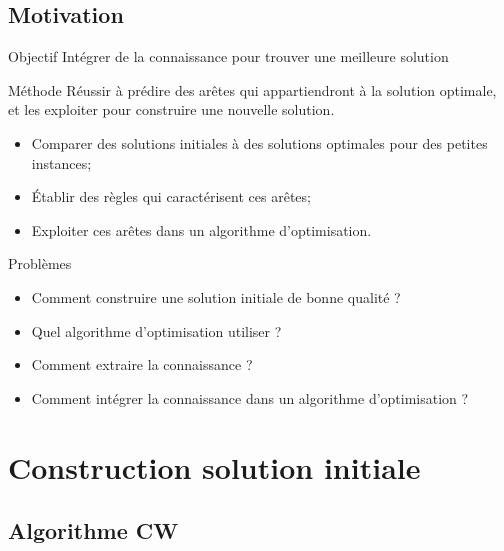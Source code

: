\documentclass{beamer}
\begin{document}
\subsection{Motivation}

\begin{frame}
\begin{block}{Objectif}
Intégrer de la connaissance pour trouver une meilleure solution
\end{block}

\begin{exampleblock}{Méthode}
Réussir à prédire des arêtes qui appartiendront à la solution optimale, et les exploiter pour construire une nouvelle solution.
\begin{itemize}
\item Comparer des solutions initiales à des solutions optimales pour des petites instances;
\item Établir des règles qui caractérisent ces arêtes;
\item Exploiter ces arêtes dans un algorithme d'optimisation.
\end{itemize}
\end{exampleblock}

\begin{alertblock}{Problèmes}
\begin{itemize}
\item Comment construire une solution initiale de bonne qualité ?
\item Quel algorithme d'optimisation utiliser ?
\item Comment extraire la connaissance ?
\item Comment intégrer la connaissance dans un algorithme d'optimisation ?
\end{itemize}
\end{alertblock}
\end{frame}

\section{Construction solution initiale}

\subsection{Algorithme CW}
\end{document}
